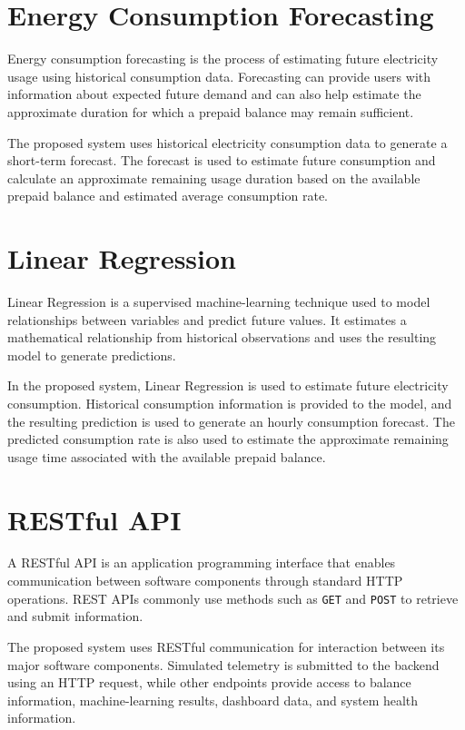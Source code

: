 \section{Energy Consumption Forecasting}

Energy consumption forecasting is the process of estimating future electricity usage using historical consumption data. Forecasting can provide users with information about expected future demand and can also help estimate the approximate duration for which a prepaid balance may remain sufficient.

The proposed system uses historical electricity consumption data to generate a short-term forecast. The forecast is used to estimate future consumption and calculate an approximate remaining usage duration based on the available prepaid balance and estimated average consumption rate.


\section{Linear Regression}

Linear Regression is a supervised machine-learning technique used to model relationships between variables and predict future values. It estimates a mathematical relationship from historical observations and uses the resulting model to generate predictions.

In the proposed system, Linear Regression is used to estimate future electricity consumption. Historical consumption information is provided to the model, and the resulting prediction is used to generate an hourly consumption forecast. The predicted consumption rate is also used to estimate the approximate remaining usage time associated with the available prepaid balance.


\section{RESTful API}

A RESTful API is an application programming interface that enables communication between software components through standard HTTP operations. REST APIs commonly use methods such as \texttt{GET} and \texttt{POST} to retrieve and submit information.

The proposed system uses RESTful communication for interaction between its major software components. Simulated telemetry is submitted to the backend using an HTTP request, while other endpoints provide access to balance information, machine-learning results, dashboard data, and system health information.


